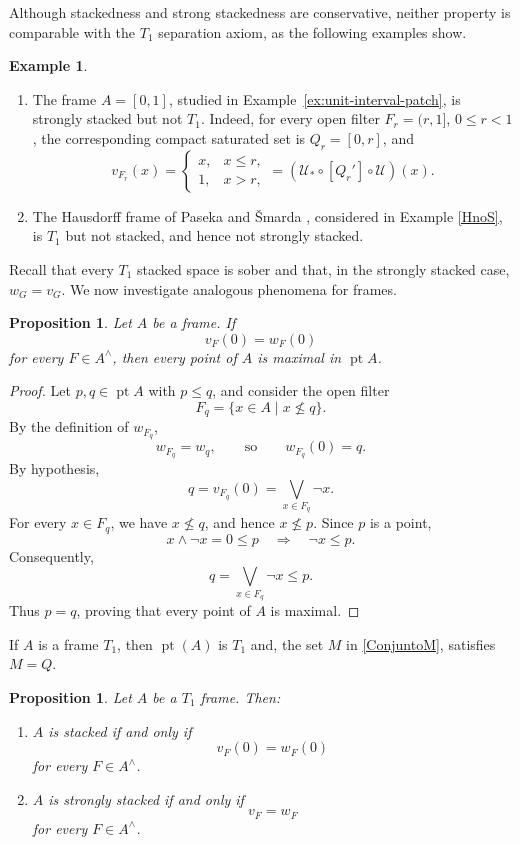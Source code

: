 \documentclass[11pt]{amsart}
\DeclareMathOperator{\pt}{pt}
\theoremstyle{plain}
\newtheorem{prop}[thm]{Proposition}
\theoremstyle{definition}
\newtheorem{ej}[thm]{Example}
\begin{document}
Although stackedness and strong stackedness are
conservative, neither property is comparable with
the $T_1$ separation axiom, as the following
examples show.

\begin{ej}\label{T1nostacked}
\mbox{ }
\begin{enumerate}
\item The frame $A=[0,1]$, studied in
Example~\ref{ex:unit-interval-patch}, is
strongly stacked but not $T_1$. Indeed,
for every open filter
$F_r=(r,1]$, $0\leq r<1$, the corresponding
compact saturated set is $Q_r=[0,r]$, and
\[
v_{F_r}(x)=
\begin{cases}
x,&x\leq r,\\
1,&x>r,
\end{cases}
=(\mathcal U_*\circ[Q_r']\circ\mathcal U)(x).
\]

\item The Hausdorff frame of Paseka and
\v{S}marda \cite{PasekaSmarda1992}, considered in
Example \ref{HnoS}, is $T_1$ but not stacked,
and hence not strongly stacked.
\end{enumerate}
\end{ej}


Recall that every $T_1$ stacked space is sober
and that, in the strongly stacked case,
$w_G=v_G$. We now investigate analogous
phenomena for frames.

\begin{prop}\label{maximosenpt}
Let $A$ be a frame. If
\[
v_F(0)=w_F(0)
\]
for every $F\in A^\wedge$, then every point of $A$ is maximal in $\pt A$.
\end{prop}

\begin{proof}
Let $p,q\in\pt A$ with $p\leq q$, and consider
the open filter
\[
F_q=\{x\in A\mid x\nleq q\}.
\]
By the definition of $w_{F_q}$,
\[
w_{F_q}=w_q,
\qquad\text{so}\qquad
w_{F_q}(0)=q.
\]
By hypothesis,
\[
q=v_{F_q}(0)=\bigvee_{x\in F_q}\neg x.
\]
For every $x\in F_q$, we have $x\nleq q$,
and hence $x\nleq p$. Since $p$ is a point,
\[
x\wedge\neg x=0\leq p
\quad\Longrightarrow\quad
\neg x\leq p.
\]
Consequently,
\[
q=\bigvee_{x\in F_q}\neg x\leq p.
\]
Thus $p=q$, proving that every point of $A$
is maximal.
\end{proof}

If $A$ is a frame $T_1$, then $\pt(A)$ is $T_1$ and, the set $M$ in \eqref{ConjuntoM}, satisfies $M=Q$.

\begin{prop}\label{focales}
Let $A$ be a $T_1$ frame. Then:
\begin{enumerate}
    \item $A$ is stacked if and only if
    \[
    v_F(0)=w_F(0)
    \]
    for every $F\in A^\wedge$.

    \item $A$ is strongly stacked if and only if
    \[
    v_F=w_F
    \]
    for every $F\in A^\wedge$.
\end{enumerate}
\end{prop}
\end{document}
